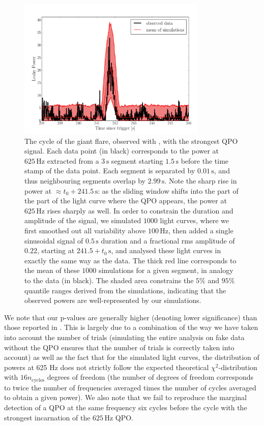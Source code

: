 \documentclass{emulateapj}
\begin{document}
\begin{figure}[htbp]
\begin{center}
\includegraphics[width=9cm]{f6.pdf}
\caption{The cycle of the giant flare, observed with \rxte, with the strongest QPO signal. Each data point (in black) corresponds to the power at $625 \,\mathrm{Hz}$ extracted from a $3\,\mathrm{s}$ segment starting $1.5\,\mathrm{s}$ before the time stamp of the data point. Each segment is separated by $0.01\,\mathrm{s}$, and thus neighbouring segments overlap by $2.99 \,\mathrm{s}$. Note the sharp rise in power at $\approx t_0+ 241.5\,\mathrm{s}$: as the sliding window shifts into the part of the part of the light curve where the QPO appears, the power at $625\,\mathrm{Hz}$ rises sharply as well. In order to constrain the duration and amplitude of the signal, we simulated $1000$ light curves, where we first smoothed out all variability above $100\,\mathrm{Hz}$, then added a single sinusoidal signal of $0.5\,\mathrm{s}$ duration and a fractional rms amplitude of $0.22$, starting at $241.5 + t_0\,\mathrm{s}$, and analysed these light curves in exactly the same way as the data. The thick red line corresponds to the mean of these $1000$ simulations for a given segment, in analogy to the data (in black). The shaded area constrains the $5\%$ and $95\%$ quantile ranges derived from the simulations, indicating that the observed powers are well-represented by our simulations.}
\label{fig:rxte_sims}
\end{center}
\end{figure}

We note that our p-values are generally higher (denoting lower significance) than those reported in \citet{Strohmayer06}. This is largely due to a combination of the way we have taken into account the number of trials (simulating the entire analysis on fake data without the QPO ensures that the number of trials is correctly taken into account) as well as the fact that for the simulated light curves, the distribution of powers at 625 Hz does not strictly follow the expected theoretical $\chi^2$-distribution with $16n_{\mathrm{cycles}}$ degrees of freedom (the number of degrees of freedom corresponds to twice the number of frequencies averaged times the number of cycles averaged to obtain a given power).
We also note that we fail to reproduce the marginal detection of a QPO at the same frequency six cycles before the cycle with the strongest incarnation of the $625\, \mathrm{Hz}$ QPO. 
\end{document}
